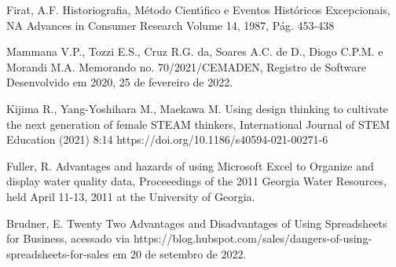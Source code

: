 \documentclass[
12pt,		%
openright,	%
twoside,  %
a4paper,			%
chapter=TITLE,		%
english,			%
french,				%
spanish,			%
brazil				%
]{USPSC-classe/USPSC}
\begin{document}
\begin{flushleft}
\begin{flushleft}
[Firat, 1987] Firat, A.F. Historiografia, M\'etodo Cient\'{\i}fico e Eventos Hist\'oricos Excepcionais, NA Advances in Consumer Research Volume 14, 1987, P\'ag. 453-438
\end{flushleft}


\end{flushleft}


\begin{flushleft}
\begin{flushleft}
[MAMMANA et al., 2022] Mammana V.P., Tozzi E.S., Cruz R.G. da, Soares A.C. de D., Diogo C.P.M. e Morandi M.A. Memorando no. 70/2021/CEMADEN, Registro de Software Desenvolvido em 2020, 25 de fevereiro de 2022.
\end{flushleft}


\end{flushleft}


\begin{flushleft}
\begin{flushleft}
[Kijima et al., 2021] Kijima R., Yang-Yoshihara M., Maekawa M. Using design thinking to cultivate the next generation of female STEAM thinkers, International Journal of STEM Education (2021) 8:14 https://doi.org/10.1186/s40594-021-00271-6
\end{flushleft}


\end{flushleft}


\begin{flushleft}
\begin{flushleft}
[FULLER, 2011] Fuller, R. Advantages and hazards of using Microsoft Excel to Organize and display water quality data, Proceeedings of the 2011 Georgia Water Resources, held April 11-13, 2011 at the University of Georgia.
\end{flushleft}


\end{flushleft}


\begin{flushleft}
\begin{flushleft}
[Brudner, 2022] Brudner, E. Twenty Two Advantages and Disadvantages of Using Spreadsheets for Business, acessado via https://blog.hubspot.com/sales/dangers-of-using-spreadsheets-for-sales em 20 de setembro de 2022.
\end{flushleft}


\end{flushleft}
\end{document}
